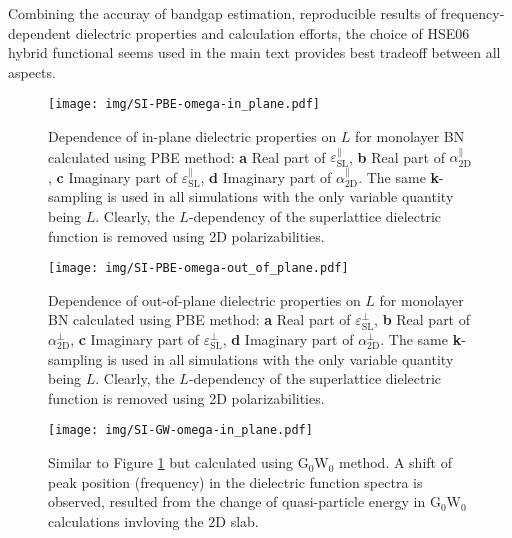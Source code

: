 \documentclass[manuscript=suppinfo,email=true,hyperref=true,keywords=false]{achemso}
\begin{document}
Combining the accuray of bandgap estimation, reproducible results of
frequency-dependent dielectric properties and calculation efforts, the
choice of HSE06 hybrid functional seems used in the main text provides
best tradeoff between all aspects.

\begin{figure}[htbp]
  \centering
 \texttt{[image: img/SI-PBE-omega-in\_plane.pdf]}
 \caption{Dependence of in-plane dielectric properties on $L$ for
   monolayer BN calculated using PBE method: \textbf{a} Real part of
   $\varepsilon_{\mathrm{SL}}^{\parallel}$, \textbf{b} Real part of
   $\alpha_{\mathrm{2D}}^{\parallel}$, \textbf{c} Imaginary part of
   $\varepsilon_{\mathrm{SL}}^{\parallel}$, \textbf{d} Imaginary part
   of $\alpha_{\mathrm{2D}}^{\parallel}$.  The same {\bf k}-sampling
   is used in all simulations with the only variable quantity being
   $L$. Clearly, the $L$-dependency of the superlattice dielectric
   function is removed using 2D polarizabilities.}
  \label{fig:PBE-omega-in}
\end{figure}

\begin{figure}[htbp]
  \centering
  \texttt{[image: img/SI-PBE-omega-out\_of\_plane.pdf]}
  \caption{Dependence of out-of-plane dielectric properties on $L$ for
    monolayer BN calculated using PBE method: \textbf{a} Real part of
    $\varepsilon_{\mathrm{SL}}^{\perp}$, \textbf{b} Real part of
    $\alpha_{\mathrm{2D}}^{\perp}$, \textbf{c} Imaginary part of
    $\varepsilon_{\mathrm{SL}}^{\perp}$, \textbf{d} Imaginary part of
    $\alpha_{\mathrm{2D}}^{\perp}$.  The same {\bf k}-sampling is used
    in all simulations with the only variable quantity being
    $L$. Clearly, the $L$-dependency of the superlattice dielectric
    function is removed using 2D polarizabilities.}
  \label{fig:PBE-omega-out}
\end{figure}



\begin{figure}[htbp]
  \centering
 \texttt{[image: img/SI-GW-omega-in\_plane.pdf]}
 \caption{Similar to Figure \ref{fig:PBE-omega-in} but calculated
   using G$_{0}$W$_{0}$ method. A shift of peak position (frequency)
   in the dielectric function spectra is observed, resulted from the
   change of quasi-particle energy in G$_{0}$W$_{0}$ calculations
   invloving the 2D slab.}
  \label{fig:GW-omega-in}
\end{figure}
\end{document}
